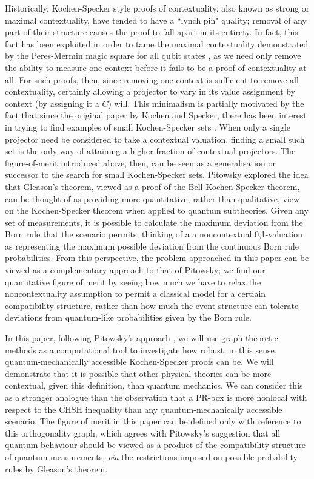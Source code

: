 \documentclass{amsart}
\theoremstyle{definition}
\begin{document}
Historically, Kochen-Specker style proofs of contextuality, also known as strong or maximal contextuality, have tended to have a ``lynch pin" quality; removal of any part of their structure causes the proof to fall apart in its entirety. In fact, this fact has been exploited in order to tame the maximal contextuality demonstrated by the Peres-Mermin magic square for all qubit states \cite{Berm2016}, as we need only remove the ability to measure one context before it fails to be a proof of contextuality at all. For such proofs, then, since removing one context is sufficient to remove all contextuality, certainly allowing a projector to vary in its value assignment by context  (by assigning it a $C$) will. This minimalism is partially motivated by the fact that since the original paper by Kochen and Specker, there has been interest in trying to find examples of small Kochen-Specker sets \cite{Aren2011}. When only a single projector need be considered to take a contextual valuation, finding a small such set is the only way of attaining a higher fraction of contextual projectors. The figure-of-merit introduced above, then, can be seen as a generalisation or successor to the search for small Kochen-Specker sets. Pitowsky \cite{Pito1998, Pito2006} explored the idea that Gleason's theorem, viewed as a proof of the Bell-Kochen-Specker theorem, can be thought of as providing more quantitative, rather than qualitative, view on the Kochen-Specker theorem when applied to quantum subtheories. Given any set of measurements, it is possible to calculate the maximum deviation from the Born rule that the scenario permits; thinking of a a noncontextual 0,1-valuation as representing the maximum possible deviation from the continuous Born rule probabilities.  From this perspective, the problem approached in this paper can be viewed as a complementary approach to that of Pitowsky;  we find our quantitative figure of merit by seeing how much we have to relax the noncontextuality assumption to permit a classical model for a certiain compatibility structure, rather than how much the event structure can tolerate deviations from quantum-like probabilities given by the Born rule.

In this paper, following Pitowsky's approach \cite{Pito1998}, we will use graph-theoretic methods as a computational tool to investigate how robust, in this sense, quantum-mechanically accessible Kochen-Specker proofs can be. We will demonstrate that it is possible that other physical theories can be more contextual, given this definition, than quantum mechanics. We can consider this as a stronger analogue than the observation that a PR-box is more nonlocal with respect to the CHSH inequality than any quantum-mechanically accessible scenario. The figure of merit in this paper can be defined only with reference to this orthogonality graph, which agrees with Pitowsky's suggestion that all quantum behaviour should be viewed as a product of the compatibility structure of quantum measurements, \emph{via} the restrictions imposed on possible probability rules by Gleason's theorem.
\end{document}
